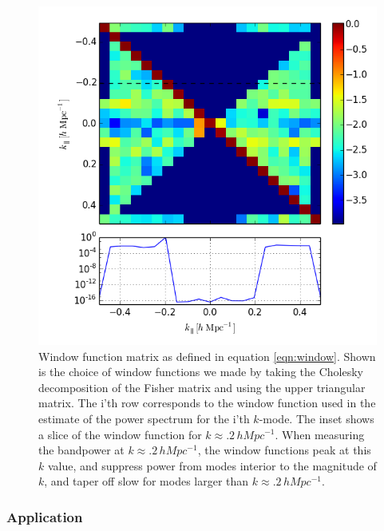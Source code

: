 \documentclass[twocolumn,numberedappendix]{emulateapj} \shorttitle{PSA64}
\begin{document}
\begin{figure}[t!]\centering
\includegraphics[width=\columnwidth, height=\columnwidth]{plots/window.png}
\caption{Window function matrix as defined in equation \ref{eqn:window}. Shown
is the choice of window functions we made by taking the Cholesky decomposition
of the Fisher matrix and using the upper triangular matrix. 
 The i'th row corresponds to the window function
used in the estimate of the power spectrum for the i'th $k$-mode. The inset
shows a slice of the window function for $k \approx .2\,hMpc^{-1}$. When
measuring the bandpower at $k \approx .2\,hMpc^{-1}$, the window functions peak
at this $k$ value, and suppress power from modes interior to the magnitude of
$k$, and taper off slow for modes larger than  $k \approx .2\,hMpc^{-1}$.}
\label{fig:window_func}
\end{figure}


\subsubsection{Application}
\end{document}
